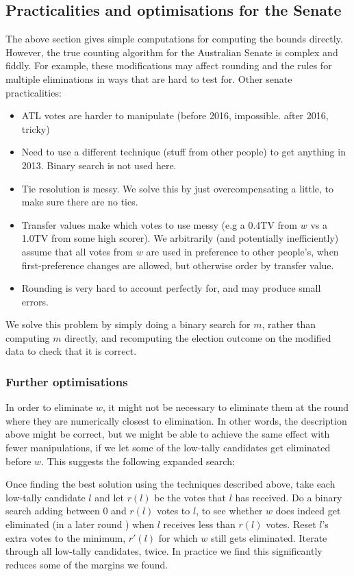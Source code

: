 \documentclass[10pt,a4paper]{article}
\begin{document}
\subsection{Practicalities and optimisations for the Senate}
The above section gives simple computations for computing the bounds directly.  However, the true counting algorithm for the Australian Senate is complex and fiddly.  For example, these modifications may affect rounding and the rules for multiple eliminations in ways that are hard to test for.  Other senate practicalities:
\begin{itemize}
\item  ATL votes are harder to manipulate (before 2016, impossible. after 2016, tricky)
\item  Need to use a different technique (stuff from other people) to get anything in 2013. Binary search is not used here.
\item  Tie resolution is messy.  We solve this by just overcompensating a little, to make sure there are no ties.
\item  Transfer values make which votes  to use messy (e.g a 0.4TV from $w$ vs a 1.0TV from some high scorer). We arbitrarily (and potentially inefficiently) assume that all votes from $w$ are used in preference to other people’s, when first-preference changes are allowed, but otherwise order by transfer value.    
\item Rounding is very hard to account perfectly for, and may produce small errors.
\end{itemize}

We solve this problem by simply doing a binary search for $m$, rather than computing $m$ directly, and recomputing the election outcome on the modified data to check that it is correct. 

\subsubsection{Further optimisations}
In order to eliminate $w$, it might not be necessary to eliminate them at the round where they are numerically closest to elimination.  In other words, the description above might be correct, but we might be able to achieve the same effect with fewer manipulations, if we let some of the low-tally candidates get eliminated before $w$.  This suggests the following expanded search:

Once finding the best solution using the techniques described above, take each low-tally candidate $l$ and let $r(l)$ be the votes that $l$ has received.  Do a binary search adding between 0 and $r(l)$ votes to $l$, to see whether $w$ does indeed get eliminated (in a later round ) when $l$ receives less than $r(l)$ votes.  Reset $l$'s extra votes to the minimum, $r'(l)$ for which $w$ still gets eliminated.  Iterate through all low-tally candidates, twice.  In practice we find this significantly reduces some of the margins we found.
\end{document}
